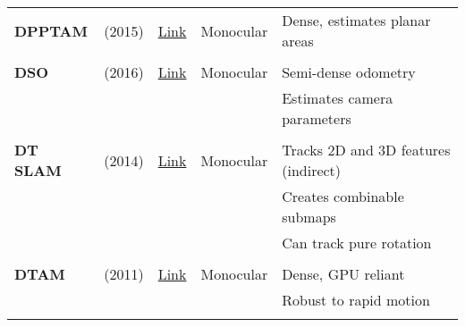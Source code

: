 \documentclass[a4paper,12pt]{scrartcl}
\begin{document}
{\begin{longtable}{l|l|l|l|l}
    \textbf{DPPTAM}        & \cite{Concha2015b} (2015)         & {\href{https://github.com/alejocb/dpptam}{Link}}                   & Monocular             & Dense, estimates planar areas\\
                           &                                   &                                                                    &                       &\\
    \textbf{DSO}           & \cite{Engel2016} (2016)           & {\href{https://github.com/JakobEngel/dso}{Link}}                   & Monocular             & Semi-dense odometry\\
                           &                                   &                                                                    &                       & Estimates camera parameters\\
                           &                                   &                                                                    &                       &\\
    \textbf{DT SLAM}       & \cite{Daniel2014} (2014)          & {\href{https://github.com/plumonito/dtslam}{Link}}                 & Monocular             & Tracks 2D and 3D features (indirect)\\
                           &                                   &                                                                    &                       & Creates combinable submaps\\
                           &                                   &                                                                    &                       & Can track pure rotation\\
                           &                                   &                                                                    &                       &\\
    \textbf{DTAM}          & \cite{Newcombe2011} (2011)        & {\href{https://github.com/anuranbaka/OpenDTAM}{Link}}              & Monocular             & Dense, GPU reliant\\
                           &                                   &                                                                    &                       & Robust to rapid motion\\
                           &                                   &                                                                    &                       &\\

\end{longtable}}
\end{document}
